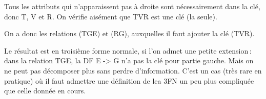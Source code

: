 \begin{solution}
Tous les attributs qui n'apparaissent pas à droite sont nécessairement
dans la clé, donc T, V  et R. On vérifie aisément que TVR est une clé
(la seule).

On a donc les relations (TGE) et (RG), auxquelles il faut ajouter la clé
(TVR). 

Le résultat est en troisième forme normale, si l'on admet une petite extension\,:
dans la relation TGE, la DF E -> G n'a pas la clé pour partie gauche. Mais on ne peut 
pas décomposer plus sans perdre d'information. C'est un cas (très rare en pratique) où il
faut admettre une définition de lea 3FN un peu plus compliquée que celle donnée en cours.


\end{solution}
